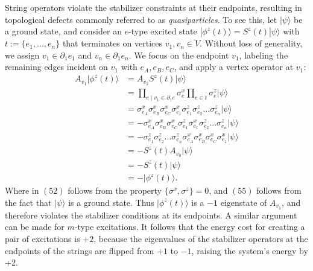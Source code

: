 \documentclass[12pt]{article}
\theoremstyle{definition}
\begin{document}
String operators violate the stabilizer constraints at their endpoints, resulting in topological defects commonly referred to as \emph{quasiparticles}. To see this, let $|\psi\rangle$ be a ground state, and consider an $e$-type excited state $|\phi^z(t)\rangle = S^z(t)|\psi\rangle$ with $t := \{e_1,...,e_n\}$ that terminates on vertices $v_1,v_n\in V$. Without loss of generality, we assign $v_1\in\partial_1e_1$ and $v_n\in\partial_1e_n$. We focus on the endpoint $v_1$, labeling the remaining edges incident on $v_1$ with $e_A,e_B,e_C$, and apply a vertex operator at $v_1$:
    \begin{align}
        A_{v_1}|\phi^z(t)\rangle &= A_{v_1}S^z(t)|\psi\rangle\\
        &= \prod_{e\mid v_1\in\partial_1e}\sigma^x_e\prod_{e\in t}\sigma^z_e|\psi\rangle\\
        &= \sigma^x_{e_A}\sigma^x_{e_B}\sigma^x_{e_C}\sigma^x_{e_1}\sigma^z_{e_1}\sigma^z_{e_2}...\sigma^z_{e_n}|\psi\rangle\\
        &= -\sigma^x_{e_A}\sigma^x_{e_B}\sigma^x_{e_C}\sigma^z_{e_1}\sigma^x_{e_1}\sigma^z_{e_2}...\sigma^z_{e_n}|\psi\rangle\\
        &= -\sigma^z_{e_1}\sigma^z_{e_2}...\sigma^z_{e_n}\sigma^x_{e_A}\sigma^x_{e_B}\sigma^x_{e_C}\sigma^x_{e_1}|\psi\rangle\\
        &= -S^z(t)A_{v_0}|\psi\rangle\\
        &= -S^z(t)|\psi\rangle\\
        &= -|\phi^z(t)\rangle.
    \end{align}
Where in $(52)$ follows from the property $\{\sigma^x,\sigma^z\} = 0$, and $(55)$ follows from the fact that $|\psi\rangle$ is a ground state. Thus $|\phi^z(t)\rangle$ is a $-1$ eigenstate of $A_{v_1}$, and therefore violates the stabilizer conditions at its endpoints. A similar argument can be made for $m$-type excitations. It follows that the energy cost for creating a pair of excitations is $+2$, because the eigenvalues of the stabilizer operators at the endpoints of the strings are flipped from $+1$ to $-1$, raising the system’s energy by $+2$.\newline
\end{document}
